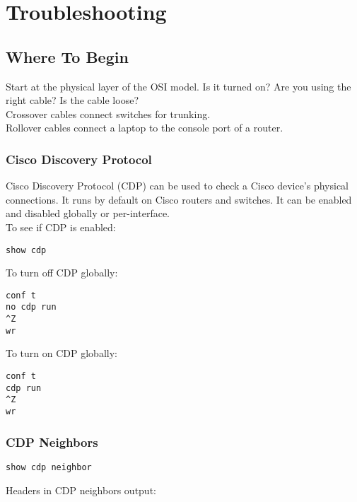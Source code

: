 \section{Troubleshooting}

\subsection{Where To Begin}

Start at the physical layer of the OSI model. Is it turned on? Are you using
the right cable? Is the cable loose?\\

Crossover cables connect switches for trunking.\\

Rollover cables connect a laptop to the console port of a router.

\subsubsection{Cisco Discovery Protocol}

Cisco Discovery Protocol (CDP) can be used to check a Cisco device's physical
connections. It runs by default on Cisco routers and switches. It can be
enabled and disabled globally or per-interface.\\

To see if CDP is enabled:

\begin{verbatim}
show cdp
\end{verbatim}

To turn off CDP globally:

\begin{verbatim}
conf t
no cdp run
^Z
wr
\end{verbatim}

To turn on CDP globally:

\begin{verbatim}
conf t
cdp run
^Z
wr
\end{verbatim}

\subsubsection{CDP Neighbors}

\begin{verbatim}
show cdp neighbor
\end{verbatim}

Headers in CDP neighbors output:

